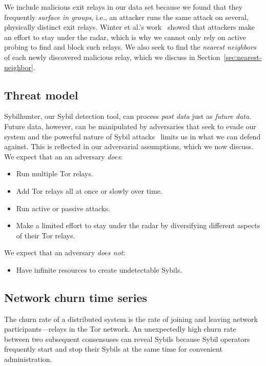 We include malicious exit relays in our data set because we found that they
frequently \emph{surface in groups}, i.e., an attacker runs the same attack on
several, physically distinct exit relays.  Winter et al.'s work~\cite[\S
5.2]{Winter2014a} showed that attackers make an effort to stay under the radar,
which is why we cannot only rely on active probing to find and block such
relays.  We also seek to find the \emph{nearest neighbors} of each newly
discovered malicious relay, which we discuss in
Section~\ref{sec:nearest-neighbor}.

\subsection{Threat model}
\label{sec:threat_model}

Sybilhunter, our Sybil detection tool, can process \emph{past data} just as
\emph{future data}.  Future data, however, can be manipulated by adversaries
that seek to evade our system and the powerful nature of Sybil
attacks~\cite{Douceur2002a} limits us in what we can defend against.  This is
reflected in our adversarial assumptions, which we now discuss.  We expect that
an an adversary \emph{does}:
\begin{itemize}
	\item Run multiple Tor relays.

	\item Add Tor relays all at once or slowly over time.

	\item Run active or passive attacks.

	\item Make a limited effort to stay under the radar by diversifying
		different aspects of their Tor relays.
\end{itemize}

We expect that an adversary \emph{does not}:
\begin{itemize}
	\item Have infinite resources to create undetectable Sybils.
\end{itemize}



\subsection{Network churn time series}
\label{sec:churn-time-series}
The churn rate of a distributed system is the rate of joining and leaving
network participants---relays in the Tor network.  An unexpectedly high churn
rate between two subsequent consensuses can reveal Sybils because Sybil
operators frequently start and stop their Sybils at the same time for convenient
administration.

